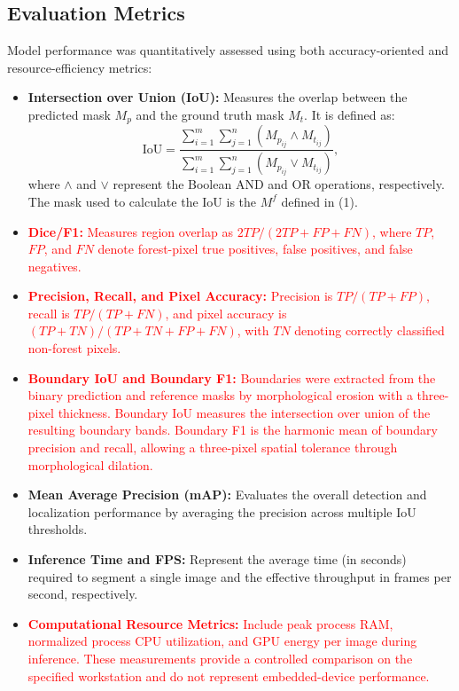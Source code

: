 \documentclass[journal,article,submit,pdftex,moreauthors]{Definitions/mdpi}
\begin{document}
\subsection{Evaluation Metrics}

Model performance was quantitatively assessed using both accuracy-oriented and resource-efficiency metrics:
\begin{itemize}
    \item \textbf{Intersection over Union (IoU):} Measures the overlap between the predicted mask $M_p$ and the ground truth mask $M_t$. It is defined as:
    \[
    \text{IoU} = \frac{\sum_{i=1}^{m} \sum_{j=1}^{n} (M_{p_{ij}} \land M_{t_{ij}})}{\sum_{i=1}^{m} \sum_{j=1}^{n} (M_{p_{ij}} \lor M_{t_{ij}})},
    \]
    where $\land$ and $\lor$ represent the Boolean AND and OR operations, respectively. The mask used to calculate the IoU is the $M^f$ defined in (1).
    \item \textcolor{red}{\textbf{Dice/F1:} Measures region overlap as $2TP/(2TP+FP+FN)$, where $TP$, $FP$, and $FN$ denote forest-pixel true positives, false positives, and false negatives.}
    \item \textcolor{red}{\textbf{Precision, Recall, and Pixel Accuracy:} Precision is $TP/(TP+FP)$, recall is $TP/(TP+FN)$, and pixel accuracy is $(TP+TN)/(TP+TN+FP+FN)$, with $TN$ denoting correctly classified non-forest pixels.}
    \item \textcolor{red}{\textbf{Boundary IoU and Boundary F1:} Boundaries were extracted from the binary prediction and reference masks by morphological erosion with a three-pixel thickness. Boundary IoU measures the intersection over union of the resulting boundary bands. Boundary F1 is the harmonic mean of boundary precision and recall, allowing a three-pixel spatial tolerance through morphological dilation.}
    \item \textbf{Mean Average Precision (mAP):} Evaluates the overall detection and localization performance by averaging the precision across multiple IoU thresholds.
    \item \textbf{Inference Time and FPS:} Represent the average time (in seconds) required to segment a single image and the effective throughput in frames per second, respectively.
    \item \textcolor{red}{\textbf{Computational Resource Metrics:} Include peak process RAM, normalized process CPU utilization, and GPU energy per image during inference. These measurements provide a controlled comparison on the specified workstation and do not represent embedded-device performance.}
\end{itemize}
\end{document}
